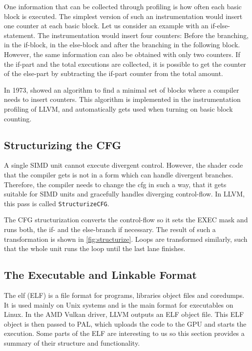 One information that can be collected through profiling is how often each basic block is executed. The simplest version of such an instrumentation would insert one counter at each basic block.
Let us consider an example with an if-else-statement. The instrumentation would insert four counters: Before the branching, in the if-block, in the else-block and after the branching in the following block.
However, the same information can also be obtained with only two counters.
If the if-part and the total executions are collected, it is possible to get the counter of the else-part by subtracting the if-part counter from the total amount.

In 1973, \citet{Knuth1973} showed an algorithm to find a minimal set of blocks where a compiler needs to insert counters.
This algorithm is implemented in the instrumentation profiling of LLVM, and automatically gets used when turning on basic block counting.

\subsection{Structurizing the CFG}
\label{sub:structurize}
A single SIMD unit cannot execute divergent control. However, the shader code that the compiler gets is not in a form which can handle divergent branches.
Therefore, the compiler needs to change the \gls{cfg} in such a way, that it gets suitable for SIMD units and gracefully handles diverging control-flow.
In LLVM, this pass is called \texttt{StructurizeCFG}.

The CFG structurization converts the control-flow so it sets the EXEC mask and runs both, the if- and the else-branch if necessary. The result of such a transformation is shown in \cref{fig:structurize}. Loops are transformed similarly, such that the whole unit runs the loop until the last lane finishes.

\begin{figure}
	\centering
	
\end{figure}

\subsection{The Executable and Linkable Format}
\label{sub:elf}
The \glsdesc{elf} (ELF) is a file format for programs, libraries object files and coredumps. It is used mainly on Unix systems and is the main format for executables on Linux.
In the AMD Vulkan driver, LLVM outputs an ELF object file. This ELF object is then passed to PAL, which uploads the code to the GPU and starts the execution.
Some parts of the ELF are interesting to us so this section provides a summary of their structure and functionality.

